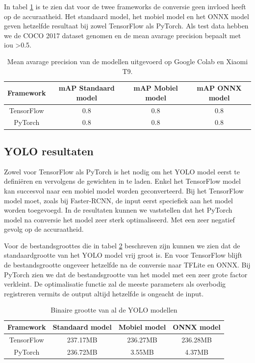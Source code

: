 In tabel \ref{tab:rcnn_acc} is te zien dat voor de twee frameworks de conversie geen invloed heeft op de accuraatheid.
Het standaard model, het mobiel model en het ONNX model geven hetzelfde resultaat bij zowel TensorFlow als PyTorch.
Als test data hebben we de COCO 2017 dataset genomen en de mean avarage precision bepaalt met iou \textgreater 0.5.
\begin{table}[!ht]
    \caption{Mean avarage precision van de modellen uitgevoerd op Google Colab en Xiaomi T9.}
\begin{tabular}{cccc}
    \hline
    Framework & mAP Standaard model & mAP Mobiel model & mAP ONNX model\\
    \hline
    TensorFlow & 0.8 & 0.8 & 0.8 \\
    PyTorch & 0.8 & 0.8 & 0.8 \\
    \hline
\end{tabular}
\label{tab:rcnn_acc}
\end{table}

\subsection{YOLO resultaten}
Zowel voor TensorFlow als PyTorch is het nodig om het YOLO model eerst te defini\"eren en vervolgens de gewichten in te laden.
Enkel het TensorFlow model kan succesvol naar een mobiel model worden geconverteerd.
Bij het TensorFlow model moet, zoals bij Faster-RCNN, de input eerst speciefiek aan het model worden toegevoegd.
In de resultaten kunnen we vaststellen dat het PyTorch model na conversie het model zeer sterk optimaliseerd.
Met een zeer negatief gevolg op de accuraatheid.

Voor de bestandsgroottes die in tabel \ref{tab:yolo_size} beschreven zijn kunnen we zien dat de standaardgrootte van het YOLO model vrij groot is.
En voor TensorFlow blijft de bestandsgrootte ongeveer hetzelfde na de conversie naar TFLite en ONNX.
Bij PyTorch zien we dat de bestandsgrootte van het model met een zeer grote factor verkleint.
De optimalisatie functie zal de meeste parameters als overbodig registreren vermits de output altijd hetzelfde is ongeacht de input.
\begin{table}[!ht]
    \caption{Binaire grootte van al de YOLO modellen}
\begin{tabular}{cccc}
    \hline
    Framework & Standaard model & Mobiel model & ONNX model \\
    \hline
    TensorFlow & 237.17MB & 236.27MB & 236.28MB \\
    PyTorch & 236.72MB & 3.55MB & 4.37MB \\
    \hline
\end{tabular}
\label{tab:yolo_size}
\end{table}


